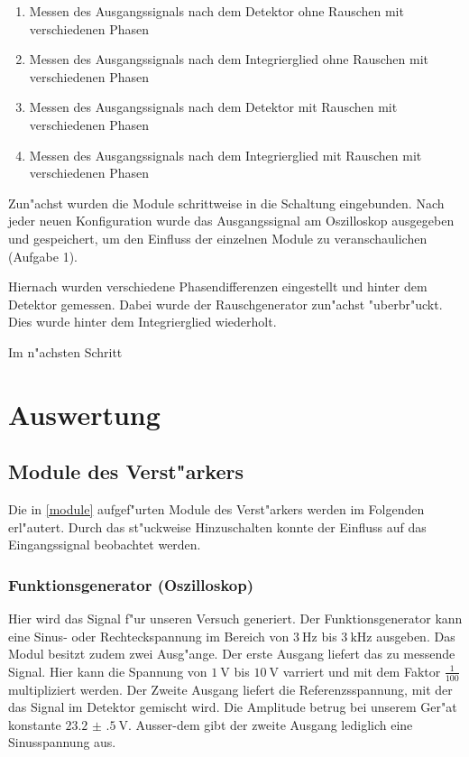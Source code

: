 \documentclass{scrartcl}
\begin{document}
\begin{enumerate}
\item \label{a1} Messen des Ausgangssignals nach dem Detektor ohne Rauschen mit verschiedenen Phasen
\item \label{a2} Messen des Ausgangssignals nach dem Integrierglied ohne Rauschen mit verschiedenen Phasen
\item \label{a3} Messen des Ausgangssignals nach dem Detektor mit Rauschen mit verschiedenen Phasen
\item \label{a4} Messen des Ausgangssignals nach dem Integrierglied mit Rauschen mit verschiedenen Phasen
\end{enumerate}

	Zun"achst wurden die Module schrittweise in die Schaltung eingebunden.
	Nach jeder neuen Konfiguration wurde das Ausgangssignal am Oszilloskop ausgegeben und gespeichert,
	um den Einfluss der einzelnen Module zu veranschaulichen (Aufgabe 1).

	Hiernach wurden verschiedene Phasendifferenzen eingestellt und hinter dem Detektor gemessen.
	Dabei wurde der Rauschgenerator zun"achst "uberbr"uckt.
	Dies wurde hinter dem Integrierglied wiederholt.

	Im n"achsten Schritt 


\section{Auswertung}

\subsection{Module des Verst"arkers}

Die in \ref{module} aufgef"urten Module des Verst"arkers werden im Folgenden erl"autert.
Durch das st"uckweise Hinzuschalten konnte der Einfluss auf das Eingangssignal beobachtet werden.

\subsubsection{Funktionsgenerator (Oszilloskop)}

Hier wird das Signal f"ur unseren Versuch generiert.
Der Funktionsgenerator kann eine Sinus- oder Rechteckspannung im Bereich von $\SI{3}{\hertz}$ bis $\SI{3}{\kilo\hertz}$ ausgeben.
Das Modul besitzt zudem zwei Ausg"ange. Der erste Ausgang liefert das zu messende Signal.
Hier kann die Spannung von $\SI{1}{\volt}$ bis $\SI{10}{\volt}$ varriert und mit dem Faktor $\frac{1}{100}$ multipliziert werden.
Der Zweite Ausgang liefert die Referenzsspannung, mit der das Signal im Detektor gemischt wird.
Die Amplitude betrug bei unserem Ger"at konstante $\SI{23.2(5)}{\volt}$.
Ausser-dem gibt der zweite Ausgang lediglich eine Sinusspannung aus.
\end{document}
